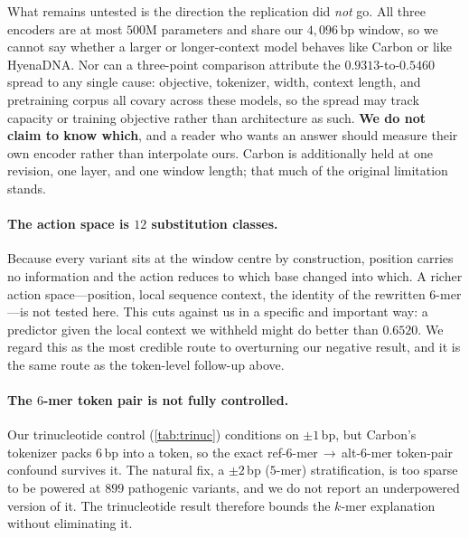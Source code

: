\documentclass{article}
\begin{document}
What remains untested is the direction the replication did \emph{not} go. All three encoders are at
most $500$M parameters and share our $4{,}096$\,bp window, so we cannot say whether a larger or
longer-context model behaves like Carbon or like HyenaDNA. Nor can a three-point comparison
attribute the $0.9313$-to-$0.5460$ spread to any single cause: objective, tokenizer, width, context
length, and pretraining corpus all covary across these models, so the spread may track capacity or
training objective rather than architecture as such. \textbf{We do not claim to know which}, and a
reader who wants an answer should measure their own encoder rather than interpolate ours. Carbon is
additionally held at one revision, one layer, and one window length; that much of the original
limitation stands.

\paragraph{The action space is $12$ substitution classes.} Because every variant sits at the window
centre by construction, position carries no information and the action reduces to which base changed
into which. A richer action space---position, local sequence context, the identity of the rewritten
$6$-mer---is not tested here. This cuts against us in a specific and important way: a predictor
given the local context we withheld might do better than $0.6520$. We regard this as the most
credible route to overturning our negative result, and it is the same route as the token-level
follow-up above.

\paragraph{The $6$-mer token pair is not fully controlled.} Our trinucleotide control
(\cref{tab:trinuc}) conditions on $\pm1$\,bp, but Carbon's tokenizer packs $6$\,bp into a token, so
the exact ref-$6$-mer\,$\to$\,alt-$6$-mer token-pair confound survives it. The natural fix, a
$\pm2$\,bp ($5$-mer) stratification, is too sparse to be powered at $899$ pathogenic variants, and
we do not report an underpowered version of it. The trinucleotide result therefore bounds the
$k$-mer explanation without eliminating it.
\end{document}
